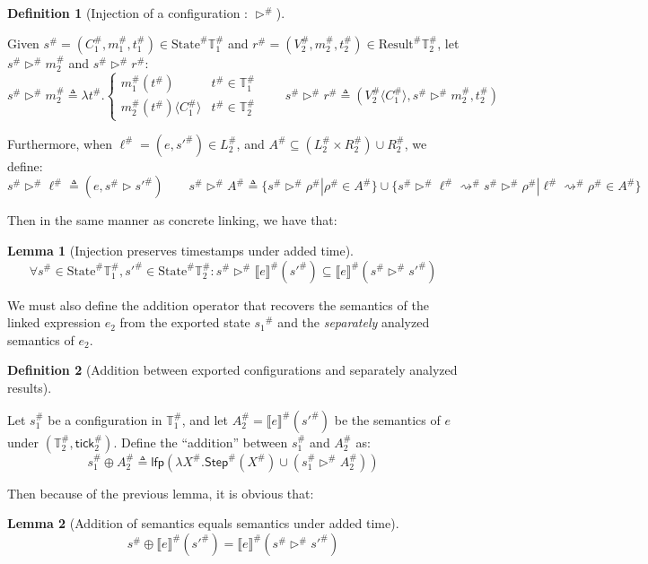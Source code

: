 \documentclass[acmsmall,review]{acmart}\settopmatter{printfolios=true,printccs=false,printacmref=false}
\theoremstyle{definition}
\newtheorem{definition}{Definition}[section]
\newtheorem{lem}{Lemma}[section]
\newcommand*{\A}[1]{{#1}^{\#}}
\newcommand*{\Time}{\mathbb{T}}
\newcommand*{\ATime}{\A{\Time}}
\newcommand*{\mem}{m}
\newcommand*{\AState}{\A{\text{State}}}
\newcommand*{\AResult}{\A{\text{Result}}}
\newcommand*{\sembracket}[1]{\lBrack{#1}\rBrack}
\newcommand*{\tick}{\mathsf{tick}}
\newcommand*{\inject}[2]{{#2}\langle{#1}\rangle}
\begin{document}
\begin{definition}[Injection of a configuration : $\A\rhd$]
  $\:$

  Given $\A{s}=(\A{C}_1,\A{\mem}_1,\A{t}_1)\in\AState{\ATime_1}$ and $\A{r}=(\A{V}_2,\A{\mem}_2,\A{t}_2)\in\AResult{\ATime_2}$,
  let $\A{s}\A\rhd \A{\mem}_2$ and $\A{s}\A\rhd \A{r}$:
  \[
    \A{s}\A\rhd\A{\mem}_2\triangleq
    \lambda \A{t}.
    \begin{cases}
      \A{\mem}_1(\A{t})                   & \A{t}\in\ATime_1 \\
      \inject{\A{C}_1}{\A{\mem}_2(\A{t})} & \A{t}\in\ATime_2
    \end{cases}
    \qquad
    \A{s}\A\rhd \A{r}\triangleq
    (\inject{\A{C}_1}{\A{V}_2},\A{s}\A\rhd \A{\mem}_2,\A{t}_2)
  \]

  Furthermore, when $\A\ell=(e,\A{s'})\in \A{L}_2$, and $\A{A}\subseteq (\A{L}_2\times \A{R}_2)\cup \A{R}_2$, we define:
  \[
    \A{s}\A\rhd\A\ell\triangleq(e,\A{s}\rhd \A{s'})\qquad
    \A{s}\A\rhd\A{A}\triangleq\{\A{s}\A\rhd\A\rho|\A\rho\in \A{A}\}\cup\{\A{s}\A\rhd\A\ell\A\rightsquigarrow \A{s}\A\rhd\A\rho|\A\ell\A\rightsquigarrow\A\rho\in \A{A}\}
  \]
\end{definition}

Then in the same manner as concrete linking, we have that:

\begin{lem}[Injection preserves timestamps under added time]
  \[
    \forall \A{s}\in\AState{\ATime_1},\A{s'}\in\AState{\ATime_2}:\A{s}\A\rhd{\A{\sembracket{e}}}(\A{s'})\subseteq\A{\sembracket{e}}(\A{s}\A\rhd\A{s'})
  \]
\end{lem}

We must also define the addition operator that recovers the semantics of the linked expression $e_2$ from the exported state $\A{s_1}$ and the \emph{separately} analyzed semantics of $e_2$.

\begin{definition}[Addition between exported configurations and separately analyzed results]
  $\:$

  Let $\A{s}_1$ be a configuration in $\ATime_1$, and let $\A{A}_2=\A{\sembracket{e}}(\A{s'})$ be the semantics of $e$ under $(\ATime_2,\A\tick_2)$.
  Define the ``addition'' between $\A{s}_1$ and $\A{A}_2$ as:
  \[
    \A{s}_1\oplus\A{A}_2\triangleq\mathsf{lfp}(\lambda\A{X}.\A{\mathsf{Step}}(\A{X})\cup(\A{s}_1\A\rhd\A{A}_2))
  \]
\end{definition}

Then because of the previous lemma, it is obvious that:
\begin{lem}[Addition of semantics equals semantics under added time]
  \[
    \A{s}\oplus\A{\sembracket{e}}(\A{s'}) = \A{\sembracket{e}}(\A{s}\A\rhd\A{s'})
  \]
\end{lem}
\end{document}
